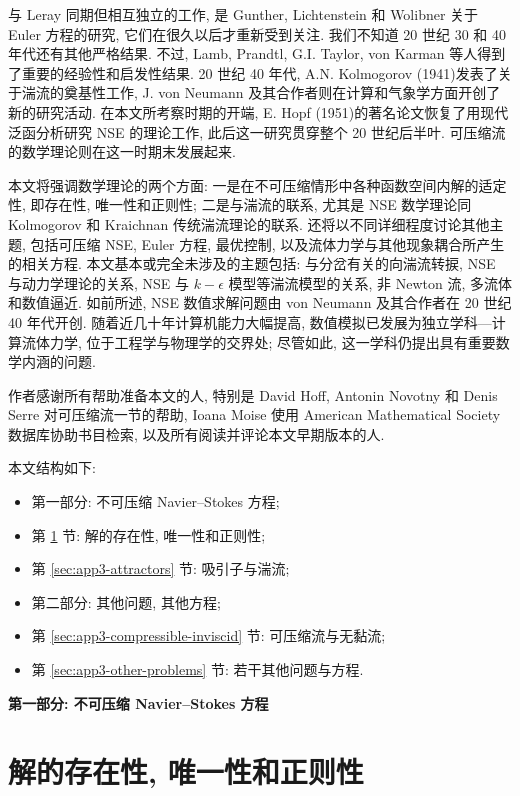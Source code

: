 与 Leray 同期但相互独立的工作, 是 Gunther, Lichtenstein 和 Wolibner 关于 Euler 方程的研究, 它们在很久以后才重新受到关注. 我们不知道 20 世纪 30 和 40 年代还有其他严格结果. 不过, Lamb, Prandtl, G.I. Taylor, von Karman 等人得到了重要的经验性和启发性结果. 20 世纪 40 年代, A.N. Kolmogorov (1941)发表了关于湍流的奠基性工作, J. von Neumann 及其合作者则在计算和气象学方面开创了新的研究活动. 在本文所考察时期的开端, E. Hopf (1951)的著名论文恢复了用现代泛函分析研究 NSE 的理论工作, 此后这一研究贯穿整个 20 世纪后半叶. 可压缩流的数学理论则在这一时期末发展起来.

本文将强调数学理论的两个方面: 一是在不可压缩情形中各种函数空间内解的适定性, 即存在性, 唯一性和正则性; 二是与湍流的联系, 尤其是 NSE 数学理论同 Kolmogorov 和 Kraichnan 传统湍流理论的联系. 还将以不同详细程度讨论其他主题, 包括可压缩 NSE, Euler 方程, 最优控制, 以及流体力学与其他现象耦合所产生的相关方程. 本文基本或完全未涉及的主题包括: 与分岔有关的向湍流转捩, NSE 与动力学理论的关系, NSE 与 $k-\epsilon$ 模型等湍流模型的关系, 非 Newton 流, 多流体和数值逼近. 如前所述, NSE 数值求解问题由 von Neumann 及其合作者在 20 世纪 40 年代开创. 随着近几十年计算机能力大幅提高, 数值模拟已发展为独立学科---计算流体力学, 位于工程学与物理学的交界处; 尽管如此, 这一学科仍提出具有重要数学内涵的问题.

作者感谢所有帮助准备本文的人, 特别是 David Hoff, Antonin Novotny 和 Denis Serre 对可压缩流一节的帮助, Ioana Moise 使用 American Mathematical Society 数据库协助书目检索, 以及所有阅读并评论本文早期版本的人.

本文结构如下:
\begin{itemize}
\item 第一部分: 不可压缩 Navier--Stokes 方程;
\item 第 \ref{sec:app3-existence} 节: 解的存在性, 唯一性和正则性;
\item 第 \ref{sec:app3-attractors} 节: 吸引子与湍流;
\item 第二部分: 其他问题, 其他方程;
\item 第 \ref{sec:app3-compressible-inviscid} 节: 可压缩流与无黏流;
\item 第 \ref{sec:app3-other-problems} 节: 若干其他问题与方程.
\end{itemize}

\hypertarget{appendix-03-page-354}{}
\begin{center}\textbf{第一部分: 不可压缩 Navier--Stokes 方程}\end{center}

\section{解的存在性, 唯一性和正则性}
\label{sec:app3-existence}

